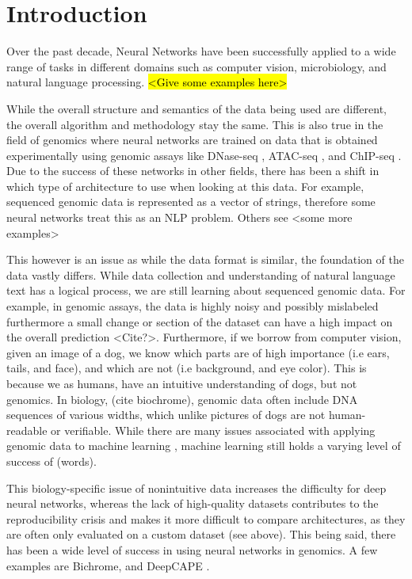 \section*{Introduction}

Over the past decade, Neural Networks have been successfully applied to a wide range of tasks in different domains such as computer vision, microbiology, and natural language processing. \hl{<Give some examples here>}

While the overall structure and semantics of the data being used are different, the overall algorithm and methodology stay the same. This is also true in the field of genomics where neural networks are trained on data that is obtained experimentally using genomic assays like DNase-seq \cite{song2010dnase}, ATAC-seq \cite{buenrostro2015atac}, and ChIP-seq \cite{park2009chip}. Due to the success of these networks in other fields, there has been a shift in which type of architecture to use when looking at this data. For example, sequenced genomic data is represented as a vector of strings, therefore some neural networks treat this as an NLP problem. Others see <some more examples>

This however is an issue as while the data format is similar, the foundation of the data vastly differs. While data collection and understanding of natural language text has a logical process, we are still learning about sequenced genomic data. For example, in genomic assays, the data is highly noisy and possibly mislabeled furthermore a small change or section of the dataset can have a high impact on the overall prediction <Cite?>. Furthermore, if we borrow from computer vision, given an image of a dog, we know which parts are of high importance (i.e ears, tails, and face), and which are not (i.e background, and eye color). This is because we as humans, have an intuitive understanding of dogs, but not genomics. In biology, (cite biochrome), genomic data often include DNA sequences of various widths, which unlike pictures of dogs are not human-readable or verifiable. While there are many issues associated with applying genomic data to machine learning \cite{whalen2022navigating}, machine learning still holds a varying level of success of (words).

This biology-specific issue of nonintuitive data increases the difficulty for deep neural networks, whereas the lack of high-quality datasets contributes to the reproducibility crisis and makes it more difficult to compare architectures, as they are often only evaluated on a custom dataset (see above). This being said, there has been a wide level of success in using neural networks in genomics. A few examples are Bichrome, and DeepCAPE \cite{chen2021deepcape}.


